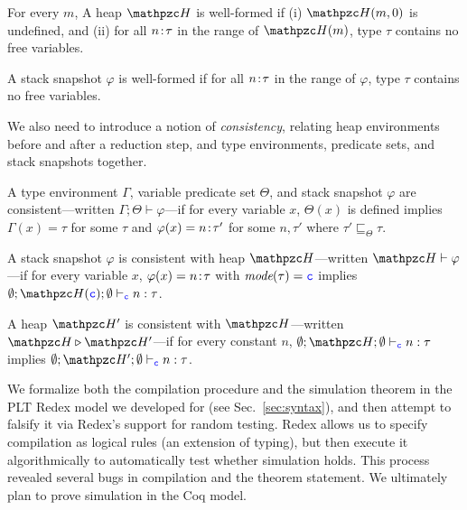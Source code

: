 \begin{definition}
For every $m$, A heap $\heap$ is well-formed if (i) $\heap(m,0)$ is undefined, and
(ii) for all ${n}\!:\!{\tau}$ in the range of $\heap(m)$, type $\tau$
contains no free variables. 
\end{definition}

\begin{definition}
A stack snapshot $\varphi$ is well-formed if
for all ${n}\!:\!{\tau}$ in the range of $\varphi$, type $\tau$
contains no free variables. 
\end{definition}

We also need to introduce a notion of
\emph{consistency}, relating heap environments before and after a
reduction step, and type environments, predicate sets, and stack
snapshots together.

\begin{definition}
A type environment $\Gamma$, variable predicate set $\Theta$, and
stack snapshot $\varphi$ are consistent---written $\Gamma;\Theta\vdash
\varphi$---if for every variable $x$, $\Theta(x)$ is defined implies
$\Gamma(x) = \tau$ for some $\tau$ and 
$\varphi(x) ={n}\!:\!{\tau'}$ for some $n,\tau'$ where $\tau' \sqsubseteq_{\Theta} \tau$. 
\end{definition}

\begin{definition}
A stack snapshot $\varphi$ is consistent with heap $\heap$---written $\heap \vdash \varphi$---if
for every variable $x$, $\varphi(x)= {n}\!:\!{\tau}$ with $\textit{mode}(\tau)=\textcolor{blue}{\texttt{c}}$ implies $\emptyset;\heap(\cmode);\emptyset \vdash_{\cmode} n:\tau$.
\end{definition}

\begin{definition}
A heap $\heap'$ is consistent with $\heap$---written $\heap \triangleright \heap'$---if
for every constant $n$, $\emptyset;\heap;\emptyset \vdash_{\cmode} n:\tau$ implies $\emptyset;\heap';\emptyset \vdash_{\cmode} n:\tau$.
\end{definition}

We formalize both the compilation procedure and the simulation
theorem in the PLT Redex model we developed for \lang (see Sec.~\ref{sec:syntax}),
and then attempt to falsify it via Redex's support for random
testing. Redex allows us
  to specify compilation as logical rules (an extension
  of typing), but then execute it algorithmically to
  automatically test whether simulation holds. This process revealed
  several bugs in compilation and the theorem statement.
%
We ultimately plan to prove simulation in the Coq model.

